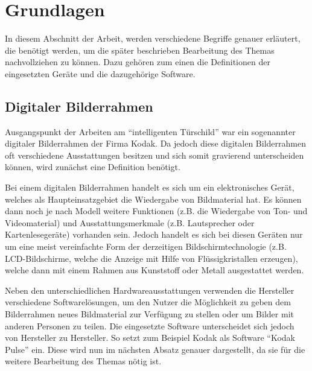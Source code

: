 \chapter{ Grundlagen }
\vspace*{-3cm}
\begin{flushleft}

In diesem Abschnitt der Arbeit, werden verschiedene Begriffe genauer erläutert, die benötigt werden, um die später beschrieben Bearbeitung
des Themas nachvollziehen zu können. Dazu gehören zum einen die Definitionen der eingesetzten Geräte und die dazugehörige Software.

\section{Digitaler Bilderrahmen}
Ausgangspunkt der Arbeiten am ``intelligenten Türschild'' war ein sogenannter digitaler Bilderrahmen der Firma Kodak. Da jedoch diese digitalen Bilderrahmen oft verschiedene Ausstattungen besitzen und sich somit gravierend unterscheiden können, wird zunächst eine Definition benötigt.

Bei einem digitalen Bilderrahmen handelt es sich um ein elektronisches Gerät, welches als Haupteinsatzgebiet die Wiedergabe von Bildmaterial hat. Es können dann noch je nach Modell weitere Funktionen (z.B. die Wiedergabe von Ton- und Videomaterial) und Ausstattungsmerkmale (z.B. Lautsprecher oder Kartenlesegeräte) vorhanden sein. Jedoch handelt es sich bei diesen Geräten nur um eine meist vereinfachte Form der derzeitigen Bildschirmtechnologie (z.B. LCD-Bildschirme, welche die Anzeige mit Hilfe von Flüssigkristallen erzeugen), welche dann mit einem Rahmen aus Kunststoff oder Metall ausgestattet werden.

Neben den unterschiedlichen Hardwareausstattungen verwenden die Hersteller verschiedene Softwarelösungen, um den Nutzer die Möglichkeit zu geben dem Bilderrahmen neues Bildmaterial zur Verfügung zu stellen oder um Bilder mit anderen Personen zu teilen. Die eingesetzte Software unterscheidet sich jedoch von Hersteller zu Hersteller. So setzt zum Beispiel Kodak als Software ``Kodak Pulse'' ein. Diese wird nun im nächsten Absatz genauer dargestellt, da sie für die weitere Bearbeitung des Themas nötig ist.


\end{flushleft}
